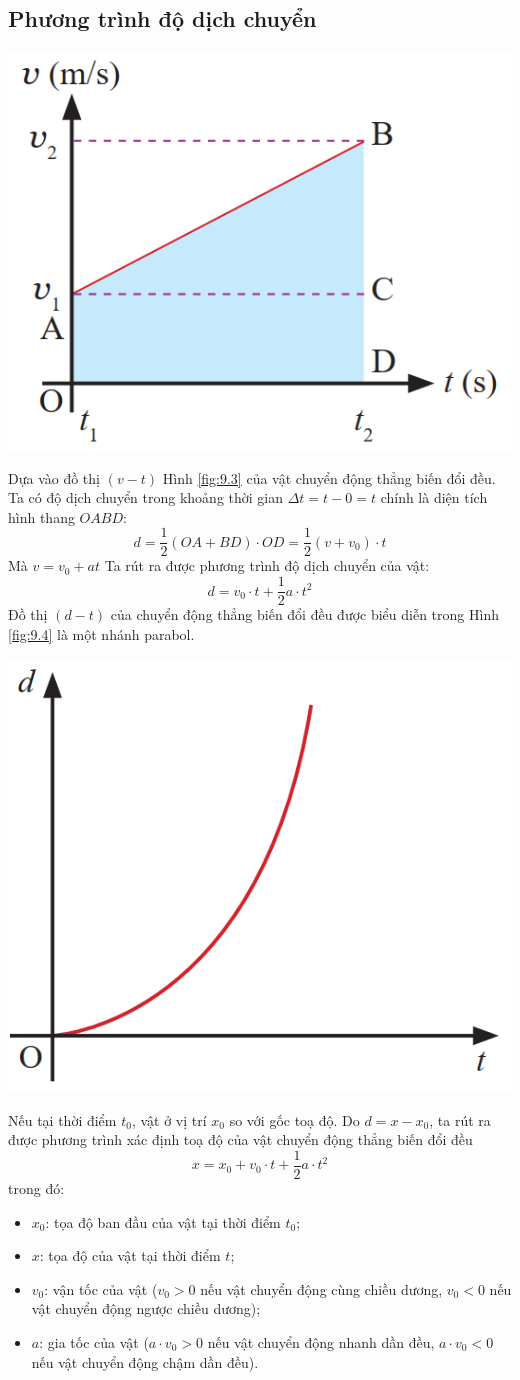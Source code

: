 \subsection{Phương trình độ dịch chuyển}
\begin{center}
	\includegraphics[width=0.3\linewidth]{../figs/VN10-2023-PH-TP008-4}
	\label{fig:9.3}
\end{center}
Dựa vào đồ thị $\left(v - t\right)$ Hình \ref{fig:9.3} của vật chuyển động thẳng biến đổi đều. Ta có độ dịch chuyển trong khoảng thời gian $\Delta t= t- 0 =t$ chính là diện tích hình thang $OABD$:
$$d=\dfrac{1}{2}\left(OA+BD\right)\cdot OD=\dfrac{1}{2}\left(v+v_0\right)\cdot t$$
Mà $v=v_0+at$
Ta rút ra được phương trình độ dịch chuyển của vật:
$$d=v_0\cdot t+\dfrac{1}{2}a\cdot t^2$$
Đồ thị $\left(d - t\right)$ của chuyển động thẳng biến đổi đều được biểu diễn trong Hình \ref{fig:9.4} là một nhánh parabol.
\begin{center}
	\includegraphics[width=0.3\linewidth]{../figs/VN10-2023-PH-TP009-4}
	\label{fig:9.4}
\end{center}
Nếu tại thời điểm $t_0$, vật ở vị trí $x_0$ so với gốc toạ độ. Do $d=x-x_0$, ta rút ra được phương trình xác định toạ độ của vật chuyển động thẳng biến đổi đều
$$x=x_0+v_0\cdot t+\dfrac{1}{2}a\cdot t^2$$
trong đó:
\begin{itemize}[label=$\circ$]
	\item $x_0$: tọa độ ban đầu của vật tại thời điểm $t_0$;
	\item $x$: tọa độ của vật tại thời điểm $t$;
	\item $v_0$: vận tốc của vật ($v_0>0$ nếu vật chuyển động cùng chiều dương, $v_0<0$ nếu vật chuyển động ngược chiều dương);
	\item $a$: gia tốc của vật ($a\cdot v_0>0$ nếu vật chuyển động nhanh dần đều, $a\cdot v_0<0$ nếu vật chuyển động chậm dần đều).
\end{itemize}
